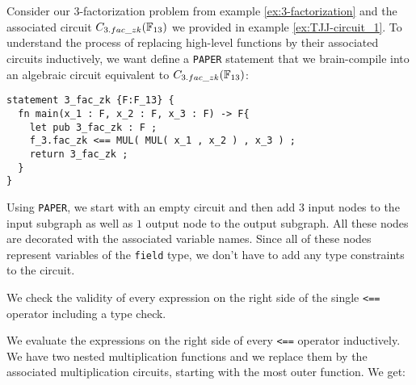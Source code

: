 \begin{example}[$3$-factorization] Consider our $3$-factorization problem from example \ref{ex:3-factorization} and the associated circuit $C_{3.fac\_zk}(\mathbb{F}_{13})$ we provided in example \ref{ex:TJJ-circuit_1}. To understand the process of replacing high-level functions by their associated circuits inductively, we want define a \texttt{PAPER} statement that we brain-compile into an algebraic circuit equivalent to $C_{3.fac\_zk}(\mathbb{F}_{13})$:
\begin{lstlisting}
statement 3_fac_zk {F:F_13} {
  fn main(x_1 : F, x_2 : F, x_3 : F) -> F{
	let pub 3_fac_zk : F ;
    f_3.fac_zk <== MUL( MUL( x_1 , x_2 ) , x_3 ) ;
    return 3_fac_zk ;
  }
}
\end{lstlisting} 
Using \texttt{PAPER}, we start with an empty circuit and then add $3$ input nodes to the input subgraph as well as $1$ output node to the output subgraph. All these nodes are decorated with the associated variable names. Since all of these nodes represent variables of the \texttt{field} type, we don't have to add any type constraints to the circuit.

We check the validity of every expression on the right side of the single \texttt{<==} operator including a type check. 

We evaluate the expressions on the right side of every \texttt{<==} operator inductively. We have two nested multiplication functions and we replace them by the associated multiplication circuits, starting with the most outer function. We get: 
\begin{center}
\end{center}
\end{example}
